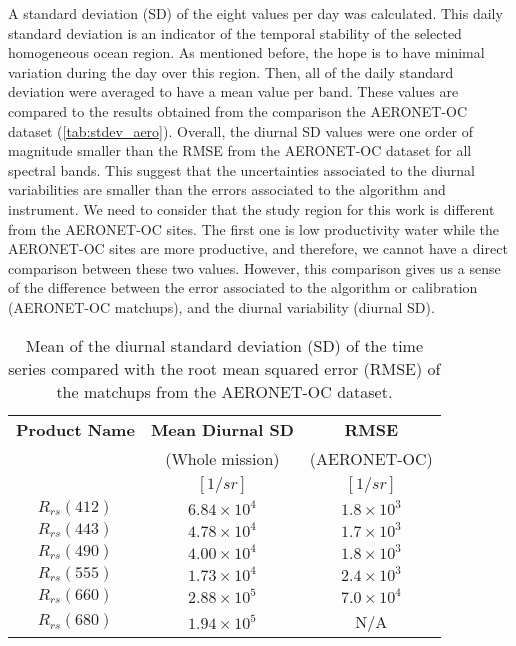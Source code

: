 \documentclass[onecolumn,3p,letterpaper,11pt]{elsarticle}
\begin{document}
A standard deviation (SD) of the eight values per day was calculated. This daily standard deviation is an indicator of the temporal stability of the selected homogeneous ocean region. As mentioned before, the hope is to have minimal variation during the day over this region. Then, all of the daily standard deviation were averaged to have a mean value per band. These values are compared to the results obtained from the comparison the AERONET-OC dataset (\autoref{tab:stdev_aero}). Overall, the diurnal SD values were one order of magnitude smaller than the RMSE from the AERONET-OC dataset for all spectral bands. This suggest that the uncertainties associated to the diurnal variabilities are smaller than the errors associated to the algorithm and instrument. We need to consider that the study region for this work is different from the AERONET-OC sites. The first one is low productivity water while the AERONET-OC sites are more productive, and therefore, we cannot have a direct comparison between these two values. However, this comparison gives us a sense of the difference between the error associated to the algorithm or calibration (AERONET-OC matchups), and the diurnal variability (diurnal SD).

\begin{table}[htbp!]
\internallinenumbers
\caption{Mean of the diurnal standard deviation (SD) of the time series compared with the root mean squared error (RMSE) of the matchups from the AERONET-OC dataset. \label{tab:stdev_aero} } 
\small
\centering
\begin{tabular}{ccc} \hline

 \bfseries{Product Name} & \bfseries{Mean Diurnal SD} & \bfseries{RMSE}\\
 & (Whole mission) & (AERONET-OC) \\ 
 & $[1/sr]$ & $[1/sr]$ \\ \hline \hline
$R_{rs}(412)$ & $6.84\times10^4$ & $1.8\times10^3$\\ 
$R_{rs}(443)$ & $4.78\times10^4$ & $1.7\times10^3$\\ 
$R_{rs}(490)$ & $4.00\times10^4$ & $1.8\times10^3$\\ 
$R_{rs}(555)$ & $1.73\times10^4$ & $2.4\times10^3$\\ 
$R_{rs}(660)$ & $2.88\times10^5$ & $7.0\times10^4$\\ 
$R_{rs}(680)$ & $1.94\times10^5$ & N/A \\ \hline
 \end{tabular}
\end{table}
\end{document}
